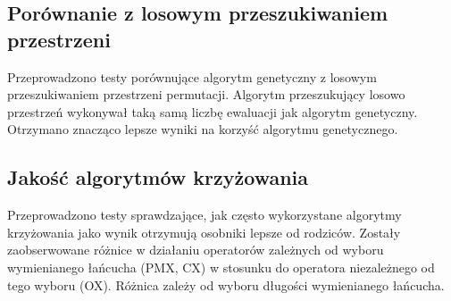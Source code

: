 \documentclass[12pt]{article}
\begin{document}
\subsection{Porównanie z losowym przeszukiwaniem przestrzeni}

Przeprowadzono testy porównujące algorytm genetyczny z losowym
przeszukiwaniem przestrzeni permutacji. Algorytm przeszukujący losowo
przestrzeń wykonywał taką samą liczbę ewaluacji jak algorytm
genetyczny. Otrzymano znacząco lepsze wyniki na korzyść algorytmu genetycznego.

\subsection{Jakość algorytmów krzyżowania}

Przeprowadzono testy sprawdzające, jak często wykorzystane algorytmy
krzyżowania jako wynik otrzymują osobniki lepsze od rodziców. Zostały
zaobserwowane różnice w działaniu operatorów zależnych od wyboru
wymienianego łańcucha (PMX, CX) w stosunku do operatora niezależnego
od tego wyboru (OX). Różnica zależy od wyboru długości wymienianego łańcucha.
\end{document}
